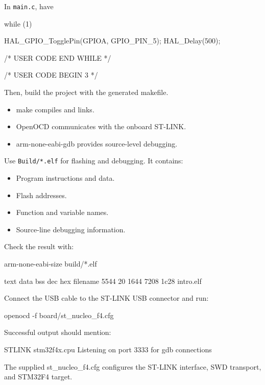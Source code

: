 \documentclass{report}
\begin{document}
    In \texttt{main.c}, have
    \bigbreak \noindent 
    \begin{ccode}
        while (1)
        {
            HAL_GPIO_TogglePin(GPIOA, GPIO_PIN_5);
            HAL_Delay(500);

            /* USER CODE END WHILE */

            /* USER CODE BEGIN 3 */
        }
    \end{ccode}
    \bigbreak \noindent 
    Then, build the project with the generated makefile.
    \begin{itemize}
        \item make compiles and links.
        \item OpenOCD communicates with the onboard ST-LINK.
        \item arm-none-eabi-gdb provides source-level debugging.
    \end{itemize}
    Use \texttt{Build/*.elf} for flashing and debugging. It contains:
    \begin{itemize}
        \item Program instructions and data.
        \item Flash addresses.
        \item Function and variable names.
        \item Source-line debugging information.
    \end{itemize}
    Check the result with:
    \bigbreak \noindent 
    \begin{bashcode}
    arm-none-eabi-size build/*.elf
    \end{bashcode}
    \bigbreak \noindent 
    \begin{bashcode}
        text	  data	   bss	   dec	   hex	filename
        5544	    20	  1644	  7208	  1c28	intro.elf
    \end{bashcode}
    \bigbreak \noindent 
    Connect the USB cable to the ST-LINK USB connector and run:
    \bigbreak \noindent 
    \begin{bashcode}
    openocd -f board/st_nucleo_f4.cfg
    \end{bashcode}
    \bigbreak \noindent 
    Successful output should mention:
    \bigbreak \noindent 
    \begin{bashcode}
        STLINK
        stm32f4x.cpu
        Listening on port 3333 for gdb connections
    \end{bashcode}
    \bigbreak \noindent 
    The supplied st\_nucleo\_f4.cfg configures the ST-LINK interface, SWD transport, and STM32F4 target.
    \bigbreak \noindent 
\end{document}
